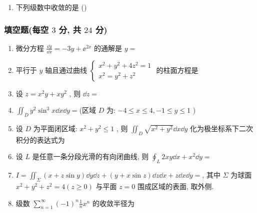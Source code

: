 \begin{enumerate}
	\item 下列级数中收敛的是 (\hspace{1pc})
\end{enumerate}

\subsubsection{填空题(每空 $3$ 分, 共 $24$ 分)}
\begin{enumerate}
	\item 微分方程 $\frac{\dd y}{\dd x}=-3 y+\ee^{2 x}$ 的通解是 $y=$\underline{\hspace{8pc}}
	
	\item 平行于 $y$ 轴且通过曲线 $\begin{cases}
	x^{2}+y^{2}+4 z^{2}=1\\
	x^{2}=y^{2}+z^{2}
	\end{cases}$ 的柱面方程是\underline{\hspace{8pc}}
	
	\item 设 $z=x^{2} y+x y^{2}$ , 则 $\dd z=$\underline{\hspace{8pc}}
	
	\item $\iint_{D} y^{2} \sin ^{3} x \dd x \dd y=$\underline{\hspace{8pc}}(区域 $D$ 为: $-4 \leq x \leq 4,-1 \leq y \leq 1$ )
	
	\item 设 $D$ 为平面闭区域: $x^{2}+y^{2} \leq 1$ , 则 $\iint_{D} \sqrt{x^{2}+y^{2}} \dd x \dd y$ 化为极坐标系下二次积分的表达式为\underline{\hspace{8pc}}
	
	\item 设 $L$ 是任意一条分段光滑的有向闭曲线, 则 $\oint_{L} 2 x y \dd x+x^{2} \dd y=$\underline{\hspace{8pc}}
	
	\item $I=\iint_{\Sigma}(x+z \sin y) \dd y \dd z+(y+x \sin z) \dd z \dd x+z \dd x \dd y=$\underline{\hspace{8pc}}, 其中 $\Sigma$ 为球面 $x^{2}+y^{2}+z^{2}=4(z \geq 0)$ 与平面 $z=0$ 围成区域的表面, 取外侧.
	
	\item 级数 $\sum_{n=1}^{\infty}(-1)^{n} \frac{1}{n} x^{n}$ 的收敛半径为\underline{\hspace{8pc}}
\end{enumerate}

